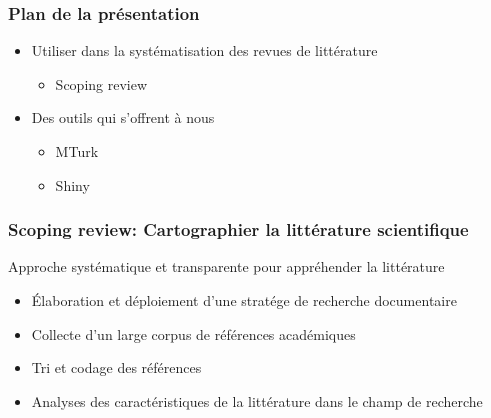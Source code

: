 \documentclass{beamer}
\begin{document}
    \begin{frame}
    
        \frametitle{Plan de la présentation} \vspace{1cm}
        
        \begin{itemize}
        
        \item{Utiliser \R dans la systématisation des revues de littérature}
        
          \begin{itemize}
            \item{Scoping review}
          \end{itemize}
        
        \item{Des outils qui s'offrent à nous}
         
          \begin{itemize}
            \item{MTurk}
            \item{Shiny}
          \end{itemize}
          
        \end{itemize}
        
    \end{frame}
    

    \begin{frame}
    
      \frametitle{Scoping review: Cartographier la littérature scientifique} \vspace{1cm}
      
    Approche systématique et transparente pour appréhender la littérature
    
        \begin{itemize}
          \item{Élaboration et déploiement d'une stratége de recherche documentaire}
          \item{Collecte d'un large corpus de références académiques}
          \item{Tri et codage des références}
          \item{Analyses des caractéristiques de la littérature dans le champ de recherche}
        \end{itemize}
          
    \end{frame}  
    
\end{document}
